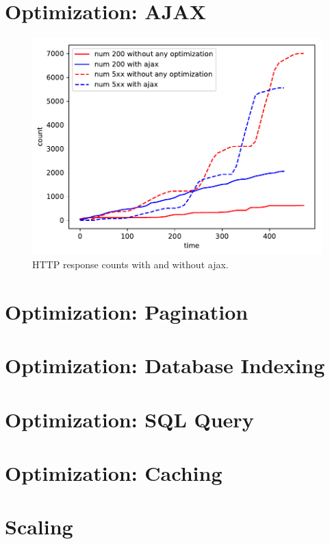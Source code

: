 \section{Optimization: AJAX}
\begin{figure}
	\centering
	\includegraphics{images/without-any-optimization-with-ajax.pdf}
	\caption{HTTP response counts with and without ajax.}
\end{figure}

\section{Optimization: Pagination}
\section{Optimization: Database Indexing}
\section{Optimization: SQL Query}
\section{Optimization: Caching}
\section{Scaling}
